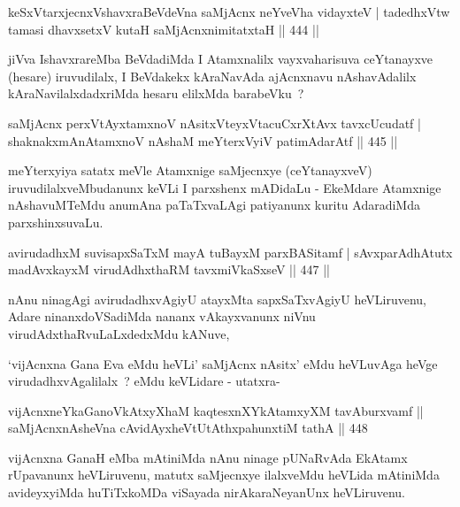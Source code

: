 \begin{shl}
keSxVtarxjecnxVshavxraBeVdeVna saMjAcnx neYveVha vidayxteV |
tadedhxVtw tamasi dhavxsetxV kutaH saMjAcnx\s nimitatxtaH \hfill  || 444 ||
\end{shl}

\begin{artha}
jiVva IshavxrareMba BeVdadiMda I Atamxnalilx vayxvaharisuva ceYtanayxve
(hesare) iruvudilalx, I BeVdakekx kAraNavAda ajAcnxnavu nAshavAdalilx
kAraNavilalxdadxriMda hesaru elilxMda barabeVku~?
\end{artha}

\begin{shl}
saMjAcnx perxVtAyx\s \s tamxnoV nAsitxVteyxVtacuCxrXtAvx tavxcUcudatf |
shaknakxmAnA\s \s tamxnoV nAshaM meYterxVyiV patimAdarAtf \hfill  || 445 ||
\end{shl}

\begin{artha}
meYterxyiya satatx meVle Atamxnige saMjecnxye (ceYtanayxveV)
iruvudilalxveMbudanunx keVLi I parxshenx mADidaLu - EkeMdare Atamxnige
nAshavuMTeMdu anumAna paTaTxvaLAgi patiyanunx kuritu AdaradiMda parxshinxsuvaLu.
\end{artha}

\begin{shl}
avirudadhxM suvisapxSaTxM mayA tuBayxM parxBASitamf |
sAvxparAdhAtutx madAvxkayxM virudAdhxthaRM tavxmiVkaSxseV \hfill  || 447 ||
\end{shl}

\begin{artha}
nAnu ninagAgi avirudadhxvAgiyU atayxMta sapxSaTxvAgiyU heVLiruvenu,
Adare ninanxdoVSadiMda nananx vAkayxvanunx niVnu
virudAdxthaRvuLaLxdedxMdu kANuve,
\end{artha}

\begin{artha}
`vijAcnxna Gana Eva eMdu heVLi' saMjAcnx nAsitx' eMdu heVLuvAga heVge
  virudadhxvAgalilalx~? eMdu keVLidare - utatxra-
\end{artha}

\begin{shl}
vijAcnxneYkaGanoVkAtxyX\s haM kaqtesxnXYkAtamxyXM tavAburxvamf ||
saMjAcnxnAsheVna cAvidAyxheVtUtAthxpahunxtiM tathA \hfill  || 448\end{shl}

\begin{artha}
vijAcnxna GanaH eMba mAtiniMda nAnu ninage pUNaRvAda EkAtamx rUpavanunx heVLiruvenu, matutx saMjecnxye ilalxveMdu heVLida mAtiniMda avideyxyiMda huTiTxkoMDa viSayada nirAkaraNeyanUnx heVLiruvenu.
\end{artha}

